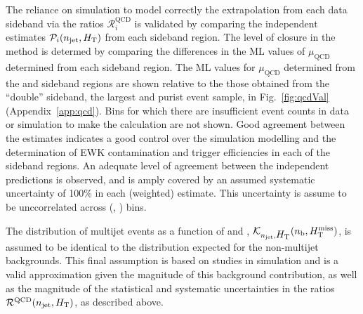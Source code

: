 The reliance on simulation to model correctly the extrapolation from
each data sideband via the ratios $\mathcal{R}_i^\mathrm{QCD}$ is
validated by comparing the independent estimates $\mathcal{P}_i(n_{\text{jet}},
\mbox{$H_\text{T}$})$ from each sideband region. The level of closure in the
method is determed by comparing the differences in the ML values of
$\mu_{\textrm{QCD}}$ determined from each sideband region. The ML
values for $\mu_{\textrm{QCD}}$ determined from the \mhtmet and \bdphi
sideband regions are shown relative to the those obtained from the
``double'' sideband, the largest and purist event sample, in
Fig.~\ref{fig:qcdVal} (Appendix~\ref{app:qcd}). Bins for which there
are insufficient event counts in data or simulation to make the
calculation are not shown. Good agreement between the estimates
indicates a good control over the simulation modelling and the
determination of EWK contamination and trigger efficiencies in each of
the sideband regions. An adequate level of agreement between the
independent predictions is observed, and is amply covered by an
assumed systematic uncertainty of 100\% in each (weighted)
estimate. This uncertainty is assume to be unccorrelated across
(\njet, \scalht) bins.

The distribution of multijet events as a function of \nb and \HTmiss,
$\mathcal{K}_{n_{\text{jet}}, \mbox{$H_\text{T}$}}( n_{\text{b}}, \mbox{$H_{\rm T}^{\rm miss}$} )$, is assumed to be
identical to the distribution expected for the non-multijet
backgrounds. This final assumption is based on studies in simulation
and is a valid approximation given the magnitude of this background
contribution, as well as the magnitude of the statistical and
systematic uncertainties in the ratios
$\mathcal{R}^\mathrm{QCD}(n_{\text{jet}}, \mbox{$H_\text{T}$})$, as described above.






